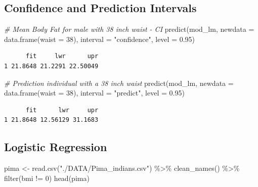 \documentclass[
]{article}
\newenvironment{Shaded}{\begin{snugshade}}{\end{snugshade}}
\newcommand{\AttributeTok}[1]{\textcolor[rgb]{0.77,0.63,0.00}{#1}}
\newcommand{\CommentTok}[1]{\textcolor[rgb]{0.56,0.35,0.01}{\textit{#1}}}
\newcommand{\DecValTok}[1]{\textcolor[rgb]{0.00,0.00,0.81}{#1}}
\newcommand{\FloatTok}[1]{\textcolor[rgb]{0.00,0.00,0.81}{#1}}
\newcommand{\FunctionTok}[1]{\textcolor[rgb]{0.00,0.00,0.00}{#1}}
\newcommand{\NormalTok}[1]{#1}
\newcommand{\OtherTok}[1]{\textcolor[rgb]{0.56,0.35,0.01}{#1}}
\newcommand{\SpecialCharTok}[1]{\textcolor[rgb]{0.00,0.00,0.00}{#1}}
\newcommand{\StringTok}[1]{\textcolor[rgb]{0.31,0.60,0.02}{#1}}
\begin{document}
\hypertarget{confidence-and-prediction-intervals}{%
\subsection{Confidence and Prediction Intervals}\label{confidence-and-prediction-intervals}}

\begin{Shaded}
\begin{Highlighting}[]
\CommentTok{\# Mean Body Fat for male with 38 inch waist {-} CI}
\FunctionTok{predict}\NormalTok{(mod\_lm, }\AttributeTok{newdata =} \FunctionTok{data.frame}\NormalTok{(}\AttributeTok{waist =} \DecValTok{38}\NormalTok{), }\AttributeTok{interval =} \StringTok{"confidence"}\NormalTok{, }\AttributeTok{level =} \FloatTok{0.95}\NormalTok{)}
\end{Highlighting}
\end{Shaded}

\begin{verbatim}
      fit     lwr      upr
1 21.8648 21.2291 22.50049
\end{verbatim}

\begin{Shaded}
\begin{Highlighting}[]
\CommentTok{\# Prediction individual with a 38 inch waist}
\FunctionTok{predict}\NormalTok{(mod\_lm, }\AttributeTok{newdata =} \FunctionTok{data.frame}\NormalTok{(}\AttributeTok{waist =} \DecValTok{38}\NormalTok{), }\AttributeTok{interval =} \StringTok{"predict"}\NormalTok{, }\AttributeTok{level =} \FloatTok{0.95}\NormalTok{)}
\end{Highlighting}
\end{Shaded}

\begin{verbatim}
      fit      lwr     upr
1 21.8648 12.56129 31.1683
\end{verbatim}

\hypertarget{logistic-regression}{%
\subsection{Logistic Regression}\label{logistic-regression}}

\begin{Shaded}
\begin{Highlighting}[]
\NormalTok{pima }\OtherTok{\textless{}{-}} \FunctionTok{read.csv}\NormalTok{(}\StringTok{"./DATA/Pima\_indians.csv"}\NormalTok{) }\SpecialCharTok{\%\textgreater{}\%} 
  \FunctionTok{clean\_names}\NormalTok{() }\SpecialCharTok{\%\textgreater{}\%} 
  \FunctionTok{filter}\NormalTok{(bmi }\SpecialCharTok{!=} \DecValTok{0}\NormalTok{)}
\FunctionTok{head}\NormalTok{(pima)}
\end{Highlighting}
\end{Shaded}
\end{document}
